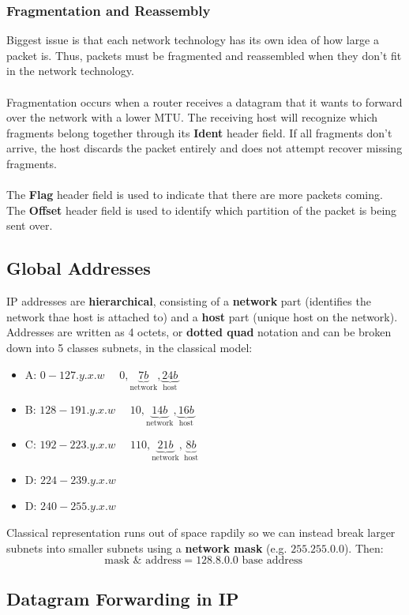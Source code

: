 \documentclass{article}
\begin{document}
  \subsubsection{Fragmentation and Reassembly}
  Biggest issue is that each network technology has its own idea of how large a packet is. Thus, packets must be fragmented and reassembled when they don't fit in the network technology. \\ \\
  Fragmentation occurs when a router receives a datagram that it wants to forward over the network with a lower MTU. The receiving host will recognize which fragments belong together through its \textbf{Ident} header field. If all fragments don't arrive, the host discards the packet entirely and does not attempt recover missing fragments. \\ \\
  The \textbf{Flag} header field is used to indicate that there are more packets coming. The \textbf{Offset} header field is used to identify which partition of the packet is being sent over.
  \subsection{Global Addresses}
  IP addresses are \textbf{hierarchical}, consisting of a \textbf{network} part (identifies the network thae host is attached to) and a \textbf{host} part (unique host on the network). Addresses are written as 4 octets, or \textbf{dotted quad} notation and can be broken down into 5 classes subnets, in the classical model:
  \begin{itemize}
    \item A: $0-127.y.x.w$ $\quad 0, \underbrace{7b}_{\text{network}}, \underbrace{24b}_{\text{host}}$
    \item B: $128 - 191.y.x.w$ $\quad 10, \underbrace{14b}_{\text{network}}, \underbrace{16b}_{\text{host}}$
    \item C: $192-223.y.x.w$ $\quad 110, \underbrace{21b}_{\text{network}}, \underbrace{8b}_{\text{host}}$
    \item D: $224-239.y.x.w$
    \item D: $240-255.y.x.w$
  \end{itemize}
  Classical representation runs out of space rapdily so we can instead break larger subnets into smaller subnets using a \textbf{network mask} (e.g. $255.255.0.0$). Then:
  \[\text{mask } \& \text{ address} = 128.8.0.0 \text{ base address }\]
  \subsection{Datagram Forwarding in IP}
\end{document}
